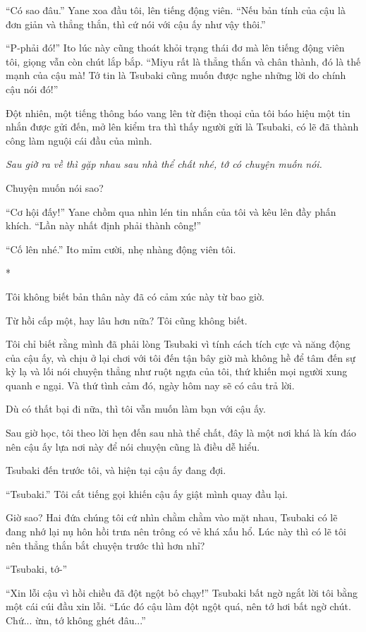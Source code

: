 {``Có sao đâu.'' Yane xoa đầu tôi, lên tiếng động viên. ``Nếu bản tính
của cậu là đơn giản và thẳng thắn, thì cứ nói với cậu ấy như vậy thôi.''

``P-phải đó!'' Ito lúc này cũng thoát khỏi trạng thái đơ mà lên tiếng
động viên tôi, giọng vẫn còn chút lắp bắp. ``Miyu rất là thẳng thắn và
chân thành, đó là thế mạnh của cậu mà! Tớ tin là Tsubaki cũng muốn được
nghe những lời do chính cậu nói đó!''

Đột nhiên, một tiếng thông báo vang lên từ điện thoại của tôi báo hiệu
một tin nhắn được gửi đến, mở lên kiểm tra thì thấy người gửi là
Tsubaki, có lẽ đã thành công làm nguội cái đầu của mình.

\emph{Sau giờ ra về thì gặp nhau sau nhà thể chất nhé, tớ có chuyện muốn
    nói.}

Chuyện muốn nói sao?

``Cơ hội đấy!'' Yane chồm qua nhìn lén tin nhắn của tôi và kêu lên đầy
phấn khích. ``Lần này nhất định phải thành công!''

``Cố lên nhé.'' Ito mỉm cười, nhẹ nhàng động viên tôi.

*

Tôi không biết bản thân này đã có cảm xúc này từ bao giờ.

Từ hồi cấp một, hay lâu hơn nữa? Tôi cũng không biết.

Tôi chỉ biết rằng mình đã phải lòng Tsubaki vì tính cách tích cực và
năng động của cậu ấy, và chịu ở lại chơi với tôi đến tận bây giờ mà
không hề để tâm đến sự kỳ lạ và lối nói chuyện thẳng như ruột ngựa của
tôi, thứ khiến mọi người xung quanh e ngại. Và thứ tình cảm đó, ngày hôm
nay sẽ có câu trả lời.

Dù có thất bại đi nữa, thì tôi vẫn muốn làm bạn với cậu ấy.

Sau giờ học, tôi theo lời hẹn đến sau nhà thể chất, đây là một nơi khá
là kín đáo nên cậu ấy lựa nơi này để nói chuyện cũng là điều dễ hiểu.

Tsubaki đến trước tôi, và hiện tại cậu ấy đang đợi.

``Tsubaki.'' Tôi cất tiếng gọi khiến cậu ấy giật mình quay đầu lại.

Giờ sao? Hai đứa chúng tôi cứ nhìn chằm chằm vào mặt nhau, Tsubaki có lẽ
đang nhớ lại nụ hôn hồi trưa nên trông có vẻ khá xấu hổ. Lúc này thì có
lẽ tôi nên thẳng thắn bắt chuyện trước thì hơn nhỉ?

``Tsubaki, tớ-''

``Xin lỗi cậu vì hồi chiều đã đột ngột bỏ chạy!'' Tsubaki bất ngờ ngắt
lời tôi bằng một cái cúi đầu xin lỗi. ``Lúc đó cậu làm đột ngột quá, nên
tớ hơi bất ngờ chút. Chứ... ừm, tớ không ghét đâu...''

}
